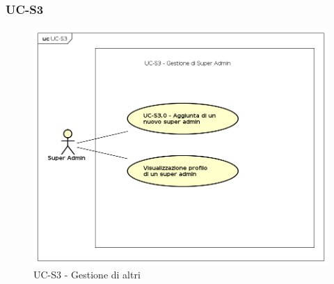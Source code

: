 \subsubsection{UC-S3}
    \begin{figure}[H]
      \begin{center}
        \includegraphics[width=12cm]{res/img/UCSuperadmin/UC-S3.png}
      \caption{UC-S3 - Gestione di altri }
      \end{center} 
    \end{figure}    
    
